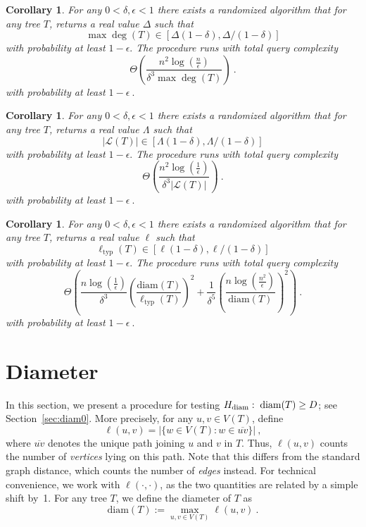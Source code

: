 \documentclass[12pt]{article}
\newtheorem{corollary}[theorem]{Corollary}
\newcommand{\diam}[1]{\mathrm{diam}\!\left(#1\right)}
\newcommand{\maxdeg}[1]{\max\!\deg\left(#1\right)}
\begin{document}
\begin{corollary}\label{corolary: maxdeg}
    For any $0<\delta,\epsilon<1$ there exists a randomized algorithm that for any tree $T$, returns a real value $\Delta$ such that $$\maxdeg{T}\in [\Delta(1-\delta),\Delta/(1-\delta)]$$ with probability at least $1-\epsilon.$ The procedure runs with total query complexity 
    $$\Theta\left( \frac{n^2\log\left(\frac{n}{\epsilon}\right)}{\delta^3\maxdeg{T}}\right)~.$$
    with probability at least $1-\epsilon~.$
\end{corollary}

\begin{corollary}\label{corolary: leaves}
    For any $0<\delta,\epsilon<1$ there exists a randomized algorithm that for any tree $T$, returns a real value $\Lambda$ such that $$|\mathcal{L}(T)|\in [\Lambda(1-\delta),\Lambda/(1-\delta)]$$ with probability at least $1-\epsilon.$ The procedure runs with total query complexity 
    $$\Theta\left( \frac{n^2\log\left(\frac{1}{\epsilon}\right)}{\delta^3|\mathcal{L}(T)|}\right)~.$$
    with probability at least $1-\epsilon~.$
\end{corollary}

\begin{corollary}\label{corolary: typical distance}
    For any $0<\delta,\epsilon<1$ there exists a randomized algorithm that for any tree $T$, returns a real value $\ell$ such that $$\ell_{\textrm{typ}}(T)\in [\ell(1-\delta),\ell/(1-\delta)]$$ with probability at least $1-\epsilon.$ The procedure runs with total query complexity 
    $$\Theta\left( \frac{n\log\left(\frac{1}{\epsilon}\right)}{\delta^3}\left( \frac{\diam{T}}{\ell_{\textrm{typ}}(T)}\right)^2
    + \frac{1}{\delta^5}\left(\frac{n\log(\frac{n^2}{\epsilon})}{\diam{T}}\right)^2\right)~.$$
    with probability at least $1-\epsilon~.$
\end{corollary}





\section{Diameter}\label{section: Testing diameters}
In this section, we present a procedure for testing $H_{\rm diam}:\;\diam{T}\geq D$; see Section~\ref{sec:diam0}.  More precisely, for any $u,v \in V(T)$, define
\[
\ell(u,v) = |\{w\in V(T) : w\in\overline{uv}\}|~,
\]
where $\overline{uv}$ denotes the unique path joining $u$ and $v$ in $T$. 
Thus, $\ell(u,v)$ counts the number of \emph{vertices} lying on this path. 
Note that this differs from the standard graph distance, which counts the number of \emph{edges} instead. 
For technical convenience, we work with $\ell(\cdot, \cdot)$, as the two quantities are related by a simple shift by~1.
For any tree $T$, we define the diameter of $T$ as
\[
\diam{T} := \max_{u,v\in V(T)}\ell(u,v)~.
\]
\end{document}
